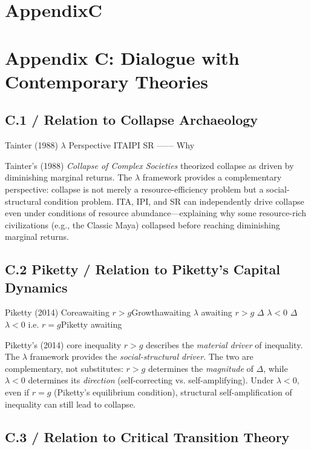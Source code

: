 \documentclass[11pt,a4paper]{article}
\theoremstyle{remark}
\newcommand{\ineq}{\Delta}
\newcommand{\lambdaparam}{\lambda}
\begin{document}
\section{AppendixC}
\section{Appendix C: Dialogue with Contemporary Theories}

\subsection{C.1  / Relation to Collapse Archaeology}

Tainter (1988) \textit{}
$\lambdaparam$ Perspective
ITAIPI  SR ——
Why


Tainter's (1988) \textit{Collapse of Complex Societies} theorized collapse as driven
by diminishing marginal returns. The $\lambdaparam$ framework provides a complementary
perspective: collapse is not merely a resource-efficiency problem but a social-structural
condition problem. ITA, IPI, and SR can independently drive collapse even under
conditions of resource abundance—explaining why some resource-rich civilizations
(e.g., the Classic Maya) collapsed before reaching diminishing marginal returns.

\subsection{C.2  Piketty  / Relation to Piketty's Capital Dynamics}

Piketty (2014) Coreawaiting $r > g$Growthawaiting
\textit{}$\lambdaparam$ awaiting\textit{}
$r > g$  $\ineq$ \textit{}
 $\lambdaparam < 0$  $\ineq$ \textit{}
 $\lambdaparam < 0$ i.e. $r = g$Piketty 
awaiting

Piketty's (2014) core inequality $r > g$ describes the \textit{material driver}
of inequality. The $\lambdaparam$ framework provides the \textit{social-structural
driver}. The two are complementary, not substitutes: $r > g$ determines the
\textit{magnitude} of $\ineq$, while $\lambdaparam < 0$ determines its \textit{direction}
(self-correcting vs. self-amplifying). Under $\lambdaparam < 0$, even if $r = g$
(Piketty's equilibrium condition), structural self-amplification of inequality can
still lead to collapse.

\subsection{C.3  / Relation to Critical Transition Theory}
\end{document}
